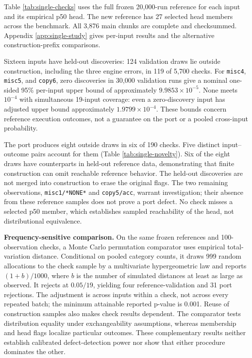 \documentclass[10pt,letterpaper]{article}
\begin{document}
Table \ref{tab:single-checks} uses the full frozen 20,000-run reference for each input and
its empirical p50 head. The new reference has 27 selected head members across the
benchmark. All 3,876 main chunks are complete and checksummed. Appendix
\ref{app:single-study} gives per-input results and the alternative construction-prefix
comparisons.



Sixteen inputs have held-out discoveries: 124 validation draws lie outside construction,
including the three engine errors, in 119 of 5,700 checks. For \texttt{misc4},
\texttt{misc5}, and \texttt{copy6}, zero discoveries in 30,000 validation runs give a
nominal one-sided 95\% per-input upper bound of approximately \(9.9853\times10^{-5}\).
None meets \(10^{-4}\) with simultaneous 19-input coverage: even a zero-discovery input
has adjusted upper bound approximately \(1.9799\times10^{-4}\). These bounds concern
reference execution outcomes, not a guarantee on the port or a pooled cross-input
probability.

The port produces eight outside draws in six of 190 checks. Five distinct input--outcome
pairs account for them (Table \ref{tab:single-novelty}). Six of the eight draws have
counterparts in held-out reference data, demonstrating that finite construction can omit
reachable reference behavior. The held-out discoveries are not merged into construction to
erase the original flags. The two remaining observations, \texttt{misc1/*NONE*} and
\texttt{copy5/acc}, warrant investigation; their absence from these reference samples does
not prove a port defect. No check misses a selected p50 member, which establishes sampled
reachability of the head, not distributional equivalence.



\textbf{Frequency-sensitive comparison.} On the same frozen references and 100-observation
checks, a Monte Carlo permutation comparator uses empirical total-variation distance.
Conditional on pooled category counts, it draws 999 random allocations to the check sample
by a multivariate hypergeometric law and reports \((1+b)/1000\), where \(b\) is the number
of simulated distances at least as large as observed. It rejects at \(0.05/19\), yielding
four reference-validation and 31 port rejections. The adjustment is across inputs within a
check, not across every repeated batch; the minimum attainable reported p-value is 0.001.
Reuse of construction samples also makes check results dependent. The comparator tests
distribution equality under exchangeability assumptions, whereas membership and head flags
localize particular outcomes. These complementary results neither establish calibrated
defect-detection power nor show that either procedure dominates the other.
\end{document}
